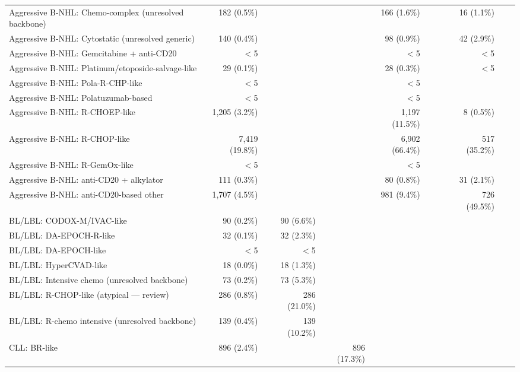 \begin{table}
{\begin{tabular}{@{}lrrrrrrrrrrr@{}}
\quad Aggressive B-NHL: Chemo-complex (unresolved backbone) & 182 (0.5\%) &  &  &  & 166 (1.6\%) &  &  &  & 16 (1.1\%) &  &  \\
\quad Aggressive B-NHL: Cytostatic (unresolved generic) & 140 (0.4\%) &  &  &  & 98 (0.9\%) &  &  &  & 42 (2.9\%) &  &  \\
\quad Aggressive B-NHL: Gemcitabine + anti-CD20 & $<$5 &  &  &  & $<$5 &  &  &  & $<$5 &  &  \\
\quad Aggressive B-NHL: Platinum/etoposide-salvage-like & 29 (0.1\%) &  &  &  & 28 (0.3\%) &  &  &  & $<$5 &  &  \\
\quad Aggressive B-NHL: Pola-R-CHP-like & $<$5 &  &  &  & $<$5 &  &  &  &  &  &  \\
\quad Aggressive B-NHL: Polatuzumab-based & $<$5 &  &  &  & $<$5 &  &  &  &  &  &  \\
\quad Aggressive B-NHL: R-CHOEP-like & 1,205 (3.2\%) &  &  &  & 1,197 (11.5\%) &  &  &  & 8 (0.5\%) &  &  \\
\quad Aggressive B-NHL: R-CHOP-like & 7,419 (19.8\%) &  &  &  & 6,902 (66.4\%) &  &  &  & 517 (35.2\%) &  &  \\
\quad Aggressive B-NHL: R-GemOx-like & $<$5 &  &  &  & $<$5 &  &  &  &  &  &  \\
\quad Aggressive B-NHL: anti-CD20 + alkylator & 111 (0.3\%) &  &  &  & 80 (0.8\%) &  &  &  & 31 (2.1\%) &  &  \\
\quad Aggressive B-NHL: anti-CD20-based other & 1,707 (4.5\%) &  &  &  & 981 (9.4\%) &  &  &  & 726 (49.5\%) &  &  \\
\quad BL/LBL: CODOX-M/IVAC-like & 90 (0.2\%) &  & 90 (6.6\%) &  &  &  &  &  &  &  &  \\
\quad BL/LBL: DA-EPOCH-R-like & 32 (0.1\%) &  & 32 (2.3\%) &  &  &  &  &  &  &  &  \\
\quad BL/LBL: DA-EPOCH-like & $<$5 &  & $<$5 &  &  &  &  &  &  &  &  \\
\quad BL/LBL: HyperCVAD-like & 18 (0.0\%) &  & 18 (1.3\%) &  &  &  &  &  &  &  &  \\
\quad BL/LBL: Intensive chemo (unresolved backbone) & 73 (0.2\%) &  & 73 (5.3\%) &  &  &  &  &  &  &  &  \\
\quad BL/LBL: R-CHOP-like (atypical — review) & 286 (0.8\%) &  & 286 (21.0\%) &  &  &  &  &  &  &  &  \\
\quad BL/LBL: R-chemo intensive (unresolved backbone) & 139 (0.4\%) &  & 139 (10.2\%) &  &  &  &  &  &  &  &  \\
\quad CLL: BR-like & 896 (2.4\%) &  &  & 896 (17.3\%) &  &  &  &  &  &  &  \\

\end{tabular}}
\end{table}
